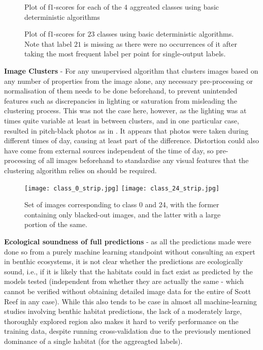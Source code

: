 \begin{figure}[H]
    \caption{Plot of f1-scores for each of the $4$ aggreated classes using basic deterministic algorithms}
\end{figure}

\begin{figure}[H]
    \caption{Plot of f1-scores for $23$ classes using basic deterministic algorithms. Note that label $21$ is missing as there were no occurrences of it after taking the most frequent label per point for single-output labels. }
\end{figure}


\textbf{Image Clusters} - For any unsupervised algorithm that clusters images based on any number of properties from the image alone, any necessary pre-processing or normalisation of them needs to be done beforehand, to prevent unintended features such as discrepancies in lighting or saturation from misleading the clustering process. This was not the case here, however, as the lighting was at times quite variable at least in between clusters, and in one particular case, resulted in pitch-black photos as in . It appears that photos were taken during different times of day, causing at least part of the difference. Distortion could also have come from external sources independent of the time of day, so pre-processing of all images beforehand to standardise any visual features that the clustering algorithm relies on should be required.

\begin{figure}[H]
    \texttt{[image: class\_0\_strip.jpg]}
    \texttt{[image: class\_24\_strip.jpg]}
    \caption{Set of images corresponding to class 0 and 24, with the former containing only blacked-out images, and the latter with a large portion of the same.}
    \label{fig:class-0}
\end{figure}

\textbf{Ecological soundness of full predictions} - as all the predictions made were done so from a purely machine learning standpoint without consulting an expert in benthic ecosystems, it is not clear whether the predictions are ecologically sound, i.e., if it is likely that the habitats could in fact exist as predicted by the models tested (independent from whether they are actually the same - which cannot be verified without obtaining detailed image data for the entire of Scott Reef in any case). While this also tends to be case in almost all machine-learning studies involving benthic habitat predictions, the lack of a moderately large, thoroughly explored region also makes it hard to verify performance on the training data, despite running cross-validation due to the previously mentioned dominance of a single habitat (for the aggreagted labels).
